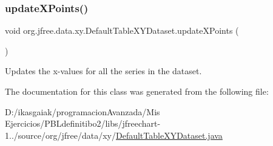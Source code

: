 \subsubsection{\texorpdfstring{update\+X\+Points()}{updateXPoints()}}
{\footnotesize\ttfamily void org.\+jfree.\+data.\+xy.\+Default\+Table\+X\+Y\+Dataset.\+update\+X\+Points (\begin{DoxyParamCaption}{ }\end{DoxyParamCaption})}

Updates the x-\/values for all the series in the dataset. 

The documentation for this class was generated from the following file\+:\begin{DoxyCompactItemize}
\item 
D\+:/ikasgaiak/programacion\+Avanzada/\+Mis Ejercicios/\+P\+B\+Ldefinitibo2/libs/jfreechart-\/1../source/org/jfree/data/xy/\mbox{\hyperlink{_default_table_x_y_dataset_8java}{Default\+Table\+X\+Y\+Dataset.\+java}}\end{DoxyCompactItemize}
